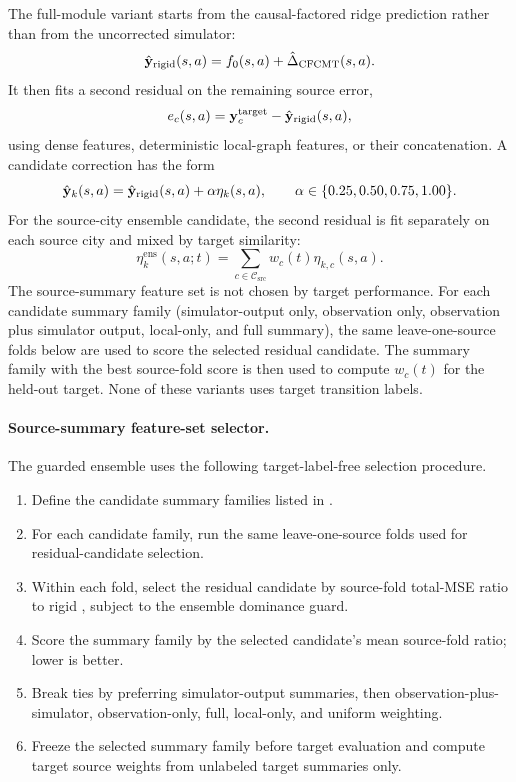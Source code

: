 The full-module variant starts from the causal-factored ridge prediction rather than from the uncorrected simulator:
\[
    \hat {\mathbf{y}}_{\mathrm{rigid}}(s,a)
    = f_0(s,a) + \hat \Delta_{\mathrm{CFCMT}}(s,a).
\]
It then fits a second residual on the remaining source error,
\[
    e_c(s,a)=\mathbf{y}_c^{\mathrm{target}}-\hat {\mathbf{y}}_{\mathrm{rigid}}(s,a),
\]
using dense features, deterministic local-graph features, or their concatenation.
A candidate correction has the form
\[
    \hat {\mathbf{y}}_k(s,a)
    =
    \hat {\mathbf{y}}_{\mathrm{rigid}}(s,a)
    + \alpha \eta_k(s,a),
    \qquad
    \alpha \in \{0.25,0.50,0.75,1.00\}.
\]
For the source-city ensemble candidate, the second residual is fit separately on each source city and mixed by target similarity:
\[
    \eta^{\mathrm{ens}}_k(s,a;t)
    =
    \sum_{c\in\mathcal{C}_{\mathrm{src}}} w_c(t)\eta_{k,c}(s,a).
\]
The source-summary feature set is not chosen by target performance.
For each candidate summary family (simulator-output only, observation only, observation plus simulator output, local-only, and full summary), the same leave-one-source folds below are used to score the selected residual candidate.
The summary family with the best source-fold score is then used to compute $w_c(t)$ for the held-out target.
None of these variants uses target transition labels.

\paragraph{Source-summary feature-set selector.}
The guarded ensemble uses the following target-label-free selection procedure.
\begin{enumerate}[leftmargin=1.5em]
    \item Define the candidate summary families listed in .
    \item For each candidate family, run the same leave-one-source folds used for residual-candidate selection.
    \item Within each fold, select the residual candidate by source-fold total-MSE ratio to rigid \ours, subject to the ensemble dominance guard.
    \item Score the summary family by the selected candidate's mean source-fold ratio; lower is better.
    \item Break ties by preferring simulator-output summaries, then observation-plus-simulator, observation-only, full, local-only, and uniform weighting.
    \item Freeze the selected summary family before target evaluation and compute target source weights from unlabeled target summaries only.
\end{enumerate}

